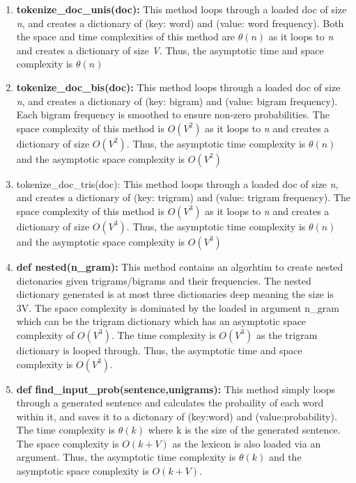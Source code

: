 \documentclass[10pt,titlepage]{article}
\begin{document}
	\begin{enumerate}
		\item \textbf{tokenize\_doc\_unis(doc): }
			\subitem This method loops through a loaded doc of size \textit{n}, and creates a dictionary of (key: word) and (value: word frequency). 
			\subitem Both the space and time complexities of this method are \textit{$\theta(n)$} as it loops to \textit{n} and creates a dictionary of size \textit{V}.
			\subitem Thus, the asymptotic time and space complexity is \textit{$\theta(n)$}
		
		\item \textbf{tokenize\_doc\_bis(doc):} 
			\subitem This method loops through a loaded doc of size \textit{n}, and creates a dictionary of (key: bigram) and (value: bigram frequency).
			\subitem Each bigram frequency is smoothed to ensure non-zero probabilities. 
			\subitem The space complexity of this method is $O(V^2)$ as it loops to \textit{n} and creates a dictionary of size $O(V^2)$.
			\subitem Thus, the asymptotic time complexity is $\theta(n)$ and the asymptotic space complexity is $O(V^2)$	
		\item tokenize\_doc\_tris(doc): 
		\subitem This method loops through a loaded doc of size \textit{n}, and creates a dictionary of (key: trigram) and (value: trigram frequency). 
		\subitem The space complexity of this method is $O(V^3)$ as it loops to \textit{n} and creates a dictionary of size $O(V^3)$.
		\subitem Thus, the asymptotic time complexity is $\theta(n)$ and the asymptotic space complexity is $O(V^3)$	
		
		\item \textbf{def nested(n\_gram):} 
		\subitem This method contains an algorhtim to create nested dictonaries given trigrams/bigrams and their frequencies. 
		\subitem The nested dictionary generated is at most three dictionaries deep meaning the size is 3V.
		\subitem The space complexity is dominated by the loaded in argument n\_gram which can be the trigram dictionary which has an asymptotic space complexity of $O(V^3)$.
		\subitem The time complexity is $O(V^3)$ as the trigram dictionary is looped through.
		\subitem Thus, the asymptotic time and space complexity is $O(V^3)$.
		
		\item \textbf{def find\_input\_prob(sentence,unigrams):} 
		\subitem This method simply loops through a generated sentence and calculates the probaility of each word within it, and saves it to a dictonary of (key:word) and (value:probability).
		\subitem The time complexity is $\theta(k)$ where k is the size of the generated sentence.
		\subitem The space complexity is $O(k+V)$ as the lexicon is also loaded via an argument.
		\subitem Thus, the asymptotic time complexity is $\theta(k)$ and the asymptotic space complexity is $O(k+V)$.
		

\end{enumerate}
\end{document}
